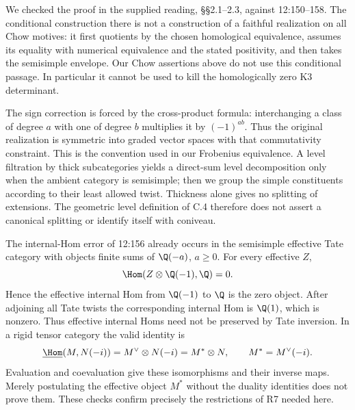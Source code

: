 \begin{remark}
\label{c:r7-audit}
We checked the proof in the supplied reading, \S\S2.1--2.3, against 12:150--158. The conditional construction there is not a construction of a faithful realization on all Chow motives: it first quotients by the chosen homological equivalence, assumes its equality with numerical equivalence and the stated positivity, and then takes the semisimple envelope. Our Chow assertions above do not use this conditional passage. In particular it cannot be used to kill the homologically zero K3 determinant.

The sign correction is forced by the cross-product formula: interchanging a class of degree $a$ with one of degree $b$ multiplies it by $(-1)^{ab}$. Thus the original realization is symmetric into graded vector spaces with that commutativity constraint. This is the convention used in our Frobenius equivalence. A level filtration by thick subcategories yields a direct-sum level decomposition only when the ambient category is semisimple; then we group the simple constituents according to their least allowed twist. Thickness alone gives no splitting of extensions. The geometric level definition of C.4 therefore does not assert a canonical splitting or identify itself with coniveau.

The internal-Hom error of 12:156 already occurs in the semisimple effective Tate category with objects finite sums of $\Q(-a)$, $a\geq0$. For every effective $Z$,
\[
 \Hom(Z\otimes\Q(-1),\Q)=0.
\]
Hence the effective internal Hom from $\Q(-1)$ to $\Q$ is the zero object. After adjoining all Tate twists the corresponding internal Hom is $\Q(1)$, which is nonzero. Thus effective internal Homs need not be preserved by Tate inversion. In a rigid tensor category the valid identity is
\[
 \underline{\Hom}(M,N(-i))
 =M^\vee\otimes N(-i)
 =M^*\otimes N,
 \qquad M^*=M^\vee(-i).
\]
Evaluation and coevaluation give these isomorphisms and their inverse maps. Merely postulating the effective object $M^*$ without the duality identities does not prove them. These checks confirm precisely the restrictions of R7 needed here.
\end{remark}

